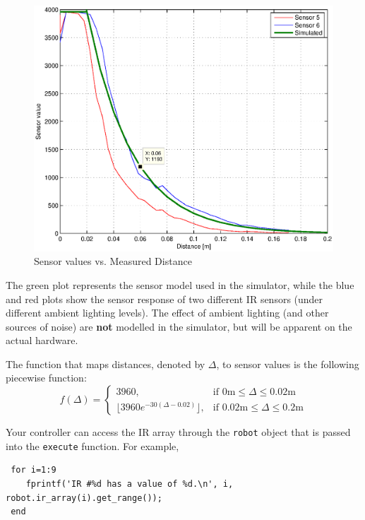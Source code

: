 \documentclass[10pt]{article}
\begin{document}
\begin{figure}
 \centering
 \includegraphics[scale=0.5]{./ir_actual.eps}
 \caption{Sensor values vs. Measured Distance}
 \label{fig:irvalues}
\end{figure}

The green plot represents the sensor model used in the simulator, while the blue and red plots show the sensor response of two different IR sensors (under different ambient lighting levels). The effect of ambient lighting (and other sources of noise) are \textbf{not} modelled in the simulator, but will be apparent on the actual hardware.

The function that maps distances, denoted by $\Delta$, to sensor values is the following piecewise function:
\begin{equation}
 f(\Delta) =
\begin{cases}
3960, & \text{if } 0\text{m} \leq \Delta \leq 0.02\text{m} \\
\lfloor3960e^{-30(\Delta-0.02)}\rfloor, & \text{if } 0.02\text{m} \leq \Delta \leq 0.2\text{m}
\end{cases}
\end{equation}

Your controller can access the IR array through the \texttt{robot} object that is passed into the \texttt{execute} function. For example,
\begin{verbatim}
 for i=1:9
    fprintf('IR #%d has a value of %d.\n', i, robot.ir_array(i).get_range());
 end
\end{verbatim}
\end{document}
